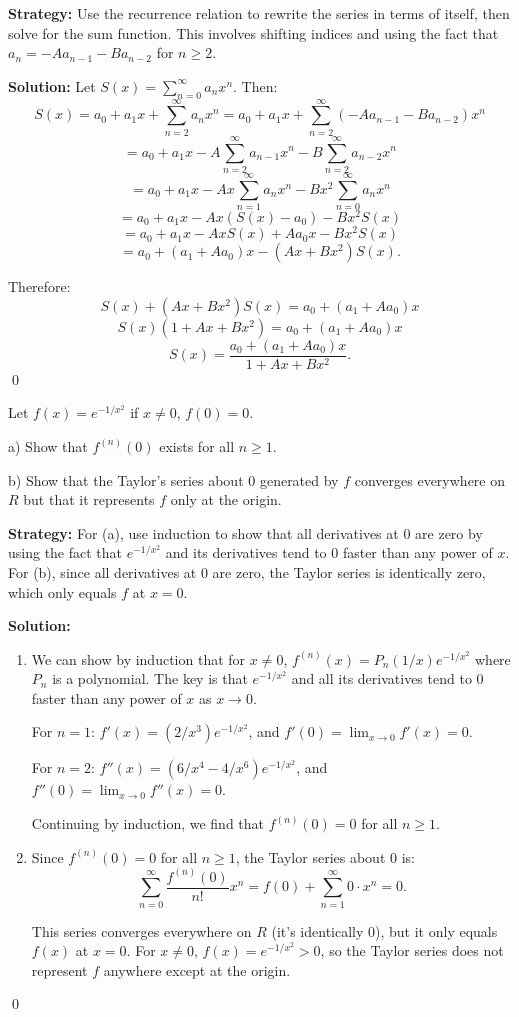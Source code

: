 \noindent\textbf{Strategy:} Use the recurrence relation to rewrite the series in terms of itself, then solve for the sum function. This involves shifting indices and using the fact that \( a_n = -Aa_{n-1} - Ba_{n-2} \) for \( n \geq 2 \).

\bigskip\noindent\textbf{Solution:} Let \( S(x) = \sum_{n=0}^{\infty} a_nx^n \). Then:
\[S(x) = a_0 + a_1x + \sum_{n=2}^{\infty} a_nx^n = a_0 + a_1x + \sum_{n=2}^{\infty} (-Aa_{n-1} - Ba_{n-2})x^n\]
\[= a_0 + a_1x - A\sum_{n=2}^{\infty} a_{n-1}x^n - B\sum_{n=2}^{\infty} a_{n-2}x^n\]
\[= a_0 + a_1x - Ax\sum_{n=1}^{\infty} a_nx^n - Bx^2\sum_{n=0}^{\infty} a_nx^n\]
\[= a_0 + a_1x - Ax(S(x) - a_0) - Bx^2S(x)\]
\[= a_0 + a_1x - AxS(x) + Aa_0x - Bx^2S(x)\]
\[= a_0 + (a_1 + Aa_0)x - (Ax + Bx^2)S(x).\]

Therefore:
\[S(x) + (Ax + Bx^2)S(x) = a_0 + (a_1 + Aa_0)x\]
\[S(x)(1 + Ax + Bx^2) = a_0 + (a_1 + Aa_0)x\]
\[S(x) = \frac{a_0 + (a_1 + Aa_0)x}{1 + Ax + Bx^2}.\]\qed


\begin{problembox}
Let \( f(x) = e^{-1/x^2} \) if \( x \neq 0 \), \( f(0) = 0 \).

a) Show that \( f^{(n)}(0) \) exists for all \( n \geq 1 \).

b) Show that the Taylor's series about 0 generated by \( f \) converges everywhere on \( R \) but that it represents \( f \) only at the origin.
\end{problembox}

\noindent\textbf{Strategy:} For (a), use induction to show that all derivatives at 0 are zero by using the fact that \( e^{-1/x^2} \) and its derivatives tend to 0 faster than any power of \( x \). For (b), since all derivatives at 0 are zero, the Taylor series is identically zero, which only equals \( f \) at \( x = 0 \).

\bigskip\noindent\textbf{Solution:}
\begin{enumerate}[label=(\alph*)]
\item We can show by induction that for \( x \neq 0 \), \( f^{(n)}(x) = P_n(1/x)e^{-1/x^2} \) where \( P_n \) is a polynomial. The key is that \( e^{-1/x^2} \) and all its derivatives tend to 0 faster than any power of \( x \) as \( x \to 0 \).

For \( n = 1 \): \( f'(x) = (2/x^3)e^{-1/x^2} \), and \( f'(0) = \lim_{x \to 0} f'(x) = 0 \).

For \( n = 2 \): \( f''(x) = (6/x^4 - 4/x^6)e^{-1/x^2} \), and \( f''(0) = \lim_{x \to 0} f''(x) = 0 \).

Continuing by induction, we find that \( f^{(n)}(0) = 0 \) for all \( n \geq 1 \).

\item Since \( f^{(n)}(0) = 0 \) for all \( n \geq 1 \), the Taylor series about 0 is:
\[\sum_{n=0}^{\infty} \frac{f^{(n)}(0)}{n!}x^n = f(0) + \sum_{n=1}^{\infty} 0 \cdot x^n = 0.\]

This series converges everywhere on \( R \) (it's identically 0), but it only equals \( f(x) \) at \( x = 0 \). For \( x \neq 0 \), \( f(x) = e^{-1/x^2} > 0 \), so the Taylor series does not represent \( f \) anywhere except at the origin.
\end{enumerate}\qed


